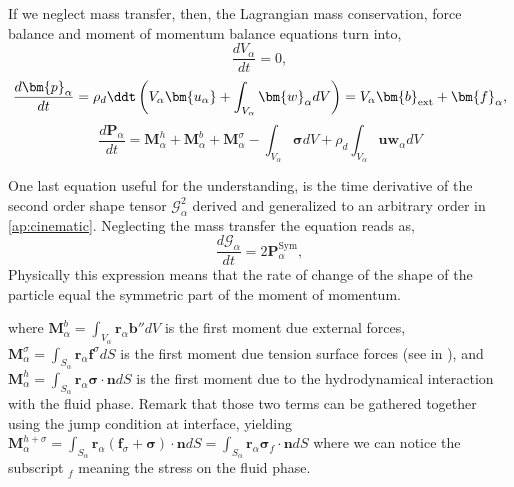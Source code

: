 If we neglect mass transfer, 
then, the Lagrangian mass conservation, force balance and moment of momentum balance equations turn into,
\begin{equation}
    \label{eq:massdef}
    \frac{d V_\alpha}{dt} 
    = 0,
\end{equation}
\begin{equation}
    \label{eq:momentumdef}
    \frac{d \bm{p}_\alpha}{dt} 
    = \rho_d \ddt  \left(V_\alpha \bm{u_\alpha} 
    + \int_{V_\alpha} \bm{w}_\alpha dV\right)
    = V_\alpha\bm{b}_{\text{ext}} 
    + \bm{f}_\alpha,
\end{equation}
\begin{equation}
    \label{eq:momentMumdef}
    \frac{d\bm{P}_\alpha}{dt} 
    = \bm{M}_\alpha^{h}
    + \bm{M}_\alpha^{b}
    + \bm{M}_\alpha^\sigma
    - \int_{V_\alpha} \bm{\sigma} dV
    + \rho_d\int_{V_\alpha} \bm{u}\bm{w}_\alpha dV
\end{equation}




One last equation useful for the understanding, is the time derivative of the second order shape tensor $\mathcal{G}^2_\alpha$ derived and generalized to an arbitrary order in \ref{ap:cinematic}. 
Neglecting the mass transfer the equation reads as,
\begin{equation}
    \frac{d \mathcal{G}_\alpha}{dt} 
    = 2 \bm{P}_\alpha^{\text{Sym}},
\end{equation}
Physically this expression means that the rate of change of the shape of the particle equal the symmetric part of the moment of momentum. 



where $\bm{M}^{b}_\alpha = \int_{V_\alpha}\bm{r}_\alpha \bm{b''}dV$ is the first moment due external forces,
$\bm{M}^{\sigma}_\alpha = \int_{S_\alpha}\bm{r}_\alpha \bm{f}^\sigma dS$ is the first moment due tension surface forces (see in ),
 and $\bm{M}^{h}_\alpha = \int_{S_\alpha}\bm{r}_\alpha \bm{\sigma} \cdot \bm{n} dS$ is the first moment due to the hydrodynamical interaction with the fluid phase. 
Remark that those two terms can be gathered together using the jump condition at interface, yielding
$\bm{M}^{h+\sigma}_\alpha = \int_{S_\alpha} \bm{r}_\alpha (\bm{f}_\sigma + \bm{\sigma}) \cdot \bm{n} dS= \int_{S_\alpha} \bm{r}_\alpha \bm{\sigma}_f \cdot \bm{n} dS$ where we can notice the subscript $_f$ meaning the stress on the fluid phase.   


